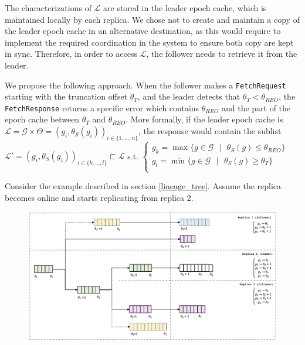 \documentclass{article}
\begin{document}
The characterizations of $\mathcal{L}$ are stored in the leader epoch cache, which is maintained locally by each replica. We chose not to create and maintain a copy of the leader epoch cache in an alternative destination, as this would require to implement the required coordination in the system to ensure both copy are kept in sync. Therefore, in order to access $\mathcal{L}$, the follower needs to retrieve it from the leader.

We propose the following approach. When the follower makes a \texttt{FetchRequest} starting with the truncation offset $\theta_T$, and the leader detects that $\theta_T < \theta_{REO}$, the \texttt{FetchResponse} returns a specific error which contains $\theta_{REO}$ and the part of the epoch cache between $\theta_T$ and $\theta_{REO}$. More formally, if the leader epoch cache is  $\mathcal{L}=\mathcal{G}\times\Theta=(g_i, \theta_S(g_i))_{i \in \{1,...,n\}}$, the response would contain the sublist $\mathcal{L'}=(g_i, \theta_S(g_i))_{i \in \{k,...,l\}} \sqsubset \mathcal{L}$ s.t. $\left\{
\begin{array}{l}
g_k=\max \texttt{} \{g \in \mathcal{G} \texttt{ } | \texttt{ } \theta_S(g) \leq \theta_{REO}\}\\
g_l=\min \texttt{} \{g \in \mathcal{G} \texttt{ } | \texttt{ } \theta_S(g) \geq \theta_T\}\\
\end{array}
\right.$

Consider the example described in section \ref{lineage_tree}. Assume the replica becomes online and starts replicating from replica 2.

\begin{figure}[H]
	\centering
	\includegraphics[scale=0.45]{lineage-tree-2.png}
	\label{fig:lineage-tree-2}
\end{figure}
\end{document}
